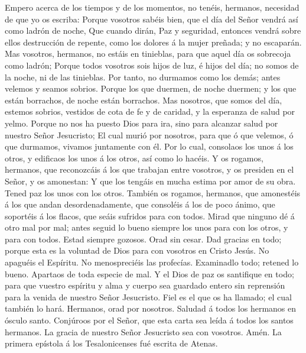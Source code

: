  Empero acerca de los tiempos y de los momentos, no tenéis,
hermanos, necesidad de que yo os escriba:  Porque vosotros
sabéis bien, que el día del Señor vendrá así como ladrón de noche,
 Que cuando dirán, Paz y seguridad, entonces vendrá sobre
ellos destrucción de repente, como los dolores á la mujer preñada; y no
escaparán.  Mas vosotros, hermanos, no estáis en tinieblas,
para que aquel día os sobrecoja como ladrón;  Porque todos
vosotros sois hijos de luz, é hijos del día; no somos de la noche, ni de
las tinieblas.  Por tanto, no durmamos como los demás; antes
velemos y seamos sobrios.  Porque los que duermen, de noche
duermen; y los que están borrachos, de noche están borrachos.
 Mas nosotros, que somos del día, estemos sobrios, vestidos
de cota de fe y de caridad, y la esperanza de salud por yelmo.
 Porque no nos ha puesto Dios para ira, sino para alcanzar
salud por nuestro Señor Jesucristo;  El cual murió por
nosotros, para que ó que velemos, ó que durmamos, vivamos juntamente con
él.  Por lo cual, consolaos los unos á los otros, y
edificaos los unos á los otros, así como lo hacéis.  Y os
rogamos, hermanos, que reconozcáis á los que trabajan entre vosotros, y
os presiden en el Señor, y os amonestan:  Y que los tengáis
en mucha estima por amor de su obra. Tened paz los unos con los otros.
 También os rogamos, hermanos, que amonestéis á los que
andan desordenadamente, que consoléis á los de poco ánimo, que soportéis
á los flacos, que seáis sufridos para con todos.  Mirad que
ninguno dé á otro mal por mal; antes seguid lo bueno siempre los unos
para con los otros, y para con todos.  Estad siempre
gozosos.  Orad sin cesar.  Dad gracias en
todo; porque esta es la voluntad de Dios para con vosotros en Cristo
Jesús.  No apaguéis el Espíritu.  No
menospreciéis las profecías.  Examinadlo todo; retened lo
bueno.  Apartaos de toda especie de mal.  Y el
Dios de paz os santifique en todo; para que vuestro espíritu y alma y
cuerpo sea guardado entero sin reprensión para la venida de nuestro
Señor Jesucristo.  Fiel es el que os ha llamado; el cual
también lo hará.  Hermanos, orad por nosotros.
 Saludad á todos los hermanos en ósculo santo.
 Conjúroos por el Señor, que esta carta sea leída á todos
los santos hermanos.  La gracia de nuestro Señor Jesucristo
sea con vosotros. Amén. La primera epístola á los Tesalonicenses fué
escrita de Atenas.
